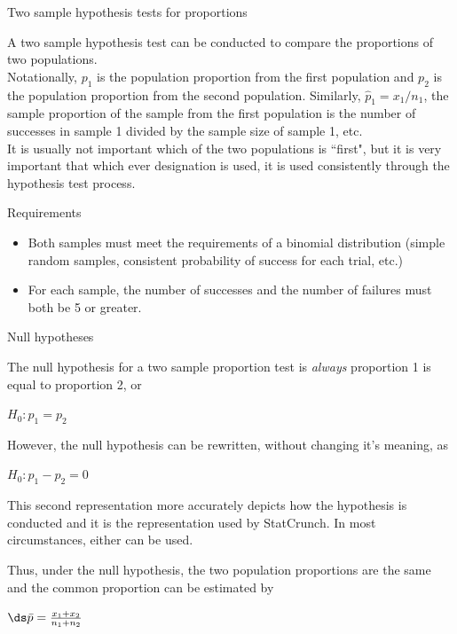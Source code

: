 \documentclass[xcolor=table, handout]{beamer}
\begin{document}
\begin{frame}{Two sample hypothesis tests for proportions}
\begin{block}{}
\large
A two sample hypothesis test can be conducted to compare the proportions of two populations.\\
\pause\medskip
Notationally, $p_1$ is the population proportion from the first population and $p_2$ is the population proportion from the second population. Similarly, $\hat p_1 = x_1/n_1$, the sample proportion of the sample from the first population is the number of successes in sample 1 divided by the sample size of sample 1, etc.\\
\pause\medskip
It is usually not important which of the two populations is ``first", but it is very important that which ever designation is used, it is used consistently through the hypothesis test process.
\end{block}
\end{frame}

\begin{frame}{Requirements}
\begin{block}{}
\large
\begin{itemize}
\item Both samples must meet the requirements of a binomial distribution (simple random samples, consistent probability of success for each trial, etc.)
\pause\item For each sample, the number of successes and the number of failures must both be 5 or greater.
\end{itemize}
\end{block}
\end{frame}


\begin{frame}{Null hypotheses}
\begin{block}{}
\large
The null hypothesis for a two sample proportion test is \emph{always} proportion 1 is equal to proportion 2, or\\
\smallskip
{\centering $H_0: p_1 = p_2$ \par}
\pause\medskip
However, the null hypothesis can be rewritten, without changing it's meaning, as\\
\smallskip
{\centering $H_0: p_1 - p_2 = 0$ \par}
\pause\medskip
This second representation more accurately depicts how the hypothesis is conducted and it is the representation used by StatCrunch. In most circumstances, either can be used.
\end{block}
\pause
\begin{block}{}
\large
Thus, under the null hypothesis, the two population proportions are the same and the common proportion can be estimated by\\
\medskip
{\centering
$\ds \bar p = \frac{x_1 + x_2}{n_1 + n_2}$
\par}
\end{block}
\end{frame}
\end{document}

